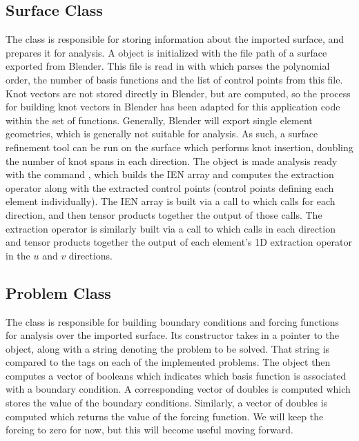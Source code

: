 \documentclass[./FinalReport.tex]{subfiles}
\begin{document}
\subsection{Surface Class}
The  class is responsible for storing information about the imported surface, and prepares it for analysis. A  object is initialized with the file path of a surface exported from Blender. This file is read in with  which parses the polynomial order, the number of basis functions and the list of control points from this file. Knot vectors are not stored directly in Blender, but are computed, so the process for building knot vectors in Blender has been adapted for this application code within the  set of functions. Generally, Blender will export single element geometries, which is generally not suitable for analysis. As such, a surface refinement tool can be run on the surface  which performs knot insertion, doubling the number of knot spans in each direction. The  object is made analysis ready with the command , which builds the IEN array and computes the extraction operator along with the extracted control points (control points defining each element individually). The IEN array is built via a call to  which calls  for each direction, and then tensor products together the output of those calls. The extraction operator is similarly built via a call to  which calls  in each direction and tensor products together the output of each element's 1D extraction operator in the $u$ and $v$ directions. 

\subsection{Problem Class}
The  class is responsible for building boundary conditions and forcing functions for analysis over the imported surface. Its constructor  takes in a pointer to the  object, along with a string denoting the problem to be solved. That string is compared to the tags on each of the implemented problems. The  object then computes a vector of booleans  which indicates which basis function is associated with a boundary condition. A corresponding vector of doubles  is computed which stores the value of the boundary conditions. Similarly, a vector of doubles  is computed which returns the value of the forcing function. We will keep the forcing to zero for now, but this will become useful moving forward. 
\end{document}
